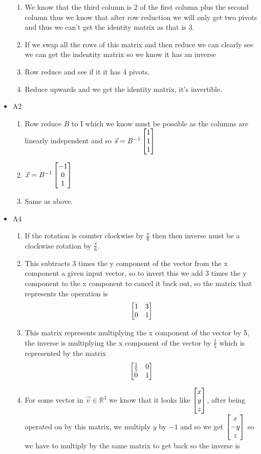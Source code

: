 \documentclass[11pt]{book}
\begin{document}
\begin{itemize}
\begin{enumerate}[label=\alph*)]
            \item We know that the third column is 2 of the first column plus the second column thus we know that after row reduction we will only get two pivots  and thus we can't get the identity matrix as that is 3.  
            \item If we swap all the rows of this matrix and then reduce we can clearly see we can get the indentity matrix so we know it has an inverse
            \item Row reduce and see if it it has 4 pivots.
            \item Reduce upwards and we get the identity matrix, it's invertible.
        \end{enumerate}
    \item A2
        \begin{enumerate}[label=a)]
            \item Row reduce $B$ to I which we know must be possible as the columns are linearly independent and so $\vec{s} = B^{-1} \begin{bmatrix} 1 \\ 1 \\ 1 \end{bmatrix}$ 
            \item $\vec{x} = B^{-1} \begin{bmatrix} -1 \\ 0 \\ 1 \end{bmatrix}$ 
            \item Same as above.
        \end{enumerate}
    \item A4
        \begin{enumerate}[label=a)]
            \item If the rotation is counter clockwise by $\frac{\pi }{6}$ then then inverse must be a clockwise rotation by $\frac{\pi }{6}$.
            \item This subtracts 3 times the y component of the vector from the x component a given input vector, so to invert this we add 3 times the y component to the x component to cancel it back out, so the matrix that represents the operation is 
                \[
                \begin{bmatrix} 1 & 3 \\ 0 & 1 \end{bmatrix}      
                \]
            \item This matrix represents multiplying the x component of the vector by 5, the inverse is multiplying the x component of the vector by $\frac{1}{5}$ which is represented by the matrix 
                \[
                \begin{bmatrix} \frac{1}{5} & 0 \\ 0 & 1 \end{bmatrix} 
                \]
            \item For some vector in $ \vec{v} \in \mathbb{R}^3 $ we know that it looks like $\begin{bmatrix} x \\ y \\ z \end{bmatrix} $, after being operated on by this matrix, we multiply $y$ by $-1$ and so we get $\begin{bmatrix} x \\  - y  \\ z \end{bmatrix} $ so we have to multiply by the same matrix to get back so the inverse is 

\end{enumerate}
\end{itemize}
\end{document}
